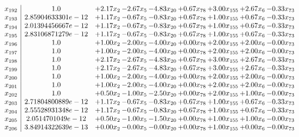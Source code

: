 \documentclass[8pt]{article}
\begin{document}
\[\begin{array}{c| c c@{\hskip 2pt} c@{\hskip 2pt} c@{\hskip 2pt} c@{\hskip 2pt} c@{\hskip 2pt} c@{\hskip 2pt} c@{\hskip 2pt} }
 x_{192}   &  1.0 & +  2.17 x_{2} & -2.67 x_{5} & -4.83 x_{20} & +  0.67 x_{78} & +  3.00 x_{155} & +  2.67 x_{6} & -0.33 x_{73}\\
 x_{193}   &  2.85904633301e-12 & +  1.17 x_{2} & -0.67 x_{5} & -0.83 x_{20} & +  0.67 x_{78} & +  1.00 x_{155} & +  0.67 x_{6} & -0.33 x_{73}\\
 x_{194}   &  2.01394456667e-12 & +  1.17 x_{2} & -0.67 x_{5} & -0.83 x_{20} & +  0.67 x_{78} & +  1.00 x_{155} & +  0.67 x_{6} & -0.33 x_{73}\\
 x_{195}   &  2.83106871279e-12 & +  1.17 x_{2} & -0.67 x_{5} & -0.83 x_{20} & +  0.67 x_{78} & +  1.00 x_{155} & +  0.67 x_{6} & -0.33 x_{73}\\
 x_{196}   &  1.0 & +  1.00 x_{2} & -2.00 x_{5} & -4.00 x_{20} & +  0.00 x_{78} & +  2.00 x_{155} & +  2.00 x_{6} & -0.00 x_{73}\\
 x_{197}   &  1.0 & +  1.00 x_{2} & -2.00 x_{5} & -4.00 x_{20} & +  0.00 x_{78} & +  2.00 x_{155} & +  2.00 x_{6} & -0.00 x_{73}\\
 x_{198}   &  1.0 & +  2.17 x_{2} & -2.67 x_{5} & -4.83 x_{20} & +  0.67 x_{78} & +  3.00 x_{155} & +  2.67 x_{6} & -0.33 x_{73}\\
 x_{199}   &  1.0 & +  2.17 x_{2} & -2.67 x_{5} & -4.83 x_{20} & +  0.67 x_{78} & +  3.00 x_{155} & +  2.67 x_{6} & -0.33 x_{73}\\
 x_{200}   &  1.0 & +  1.00 x_{2} & -2.00 x_{5} & -4.00 x_{20} & +  0.00 x_{78} & +  2.00 x_{155} & +  2.00 x_{6} & -0.00 x_{73}\\
 x_{201}   &  1.0 & +  1.00 x_{2} & -2.00 x_{5} & -4.00 x_{20} & +  0.00 x_{78} & +  2.00 x_{155} & +  2.00 x_{6} & -0.00 x_{73}\\
 x_{202}   &  1.0 & +  0.50 x_{2} & -1.00 x_{5} & -2.50 x_{20} & +  0.00 x_{78} & +  2.00 x_{155} & +  1.00 x_{6} & -0.00 x_{73}\\
 x_{203}   &  2.71804800889e-12 & +  1.17 x_{2} & -0.67 x_{5} & -0.83 x_{20} & +  0.67 x_{78} & +  1.00 x_{155} & +  0.67 x_{6} & -0.33 x_{73}\\
 x_{204}   &  2.55528931348e-12 & +  1.17 x_{2} & -0.67 x_{5} & -0.83 x_{20} & +  0.67 x_{78} & +  1.00 x_{155} & +  0.67 x_{6} & -0.33 x_{73}\\
 x_{205}   &  2.0514701049e-12 & +  0.50 x_{2} & -1.00 x_{5} & -1.50 x_{20} & +  0.00 x_{78} & +  1.00 x_{155} & +  1.00 x_{6} & -0.00 x_{73}\\
 x_{206}   &  3.84914322639e-13 & +  0.00 x_{2} & -0.00 x_{5} & -0.00 x_{20} & +  0.00 x_{78} & +  1.00 x_{155} & +  0.00 x_{6} & -0.00 x_{73}\\

\end{array}\]
\end{document}
